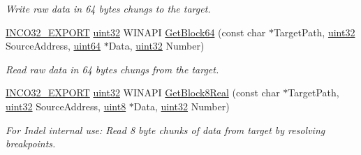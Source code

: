 \begin{DoxyCompactItemize}
\begin{DoxyCompactList}\small\item\em Write raw data in 64 bytes chungs to the target. \end{DoxyCompactList}\item 
\hyperlink{inco__32_8h_a09505cad5bbb66fc36750a4fbca0444b}{I\+N\+C\+O32\+\_\+\+E\+X\+P\+O\+RT} \hyperlink{indeltypes_8h_a4b435a49c74bb91f284f075e63416cb6}{uint32} W\+I\+N\+A\+PI \hyperlink{group__commonfunctions_ga0dd1bf74ec3dd28ae6d784db54339802}{Get\+Block64} (const char $\ast$Target\+Path, \hyperlink{indeltypes_8h_a4b435a49c74bb91f284f075e63416cb6}{uint32} Source\+Address, \hyperlink{indeltypes_8h_ac6afe794ed283c11fb63426a58188e5e}{uint64} $\ast$Data, \hyperlink{indeltypes_8h_a4b435a49c74bb91f284f075e63416cb6}{uint32} Number)
\begin{DoxyCompactList}\small\item\em Read raw data in 64 bytes chungs from the target. \end{DoxyCompactList}\item 
\hyperlink{inco__32_8h_a09505cad5bbb66fc36750a4fbca0444b}{I\+N\+C\+O32\+\_\+\+E\+X\+P\+O\+RT} \hyperlink{indeltypes_8h_a4b435a49c74bb91f284f075e63416cb6}{uint32} W\+I\+N\+A\+PI \hyperlink{group__commonfunctions_gae156a8a2456bc41746e3452c609ee2fd}{Get\+Block8\+Real} (const char $\ast$Target\+Path, \hyperlink{indeltypes_8h_a4b435a49c74bb91f284f075e63416cb6}{uint32} Source\+Address, \hyperlink{indeltypes_8h_adde6aaee8457bee49c2a92621fe22b79}{uint8} $\ast$Data, \hyperlink{indeltypes_8h_a4b435a49c74bb91f284f075e63416cb6}{uint32} Number)
\begin{DoxyCompactList}\small\item\em For Indel internal use\+: Read 8 byte chunks of data from target by resolving breakpoints. \end{DoxyCompactList}\end{DoxyCompactItemize}
